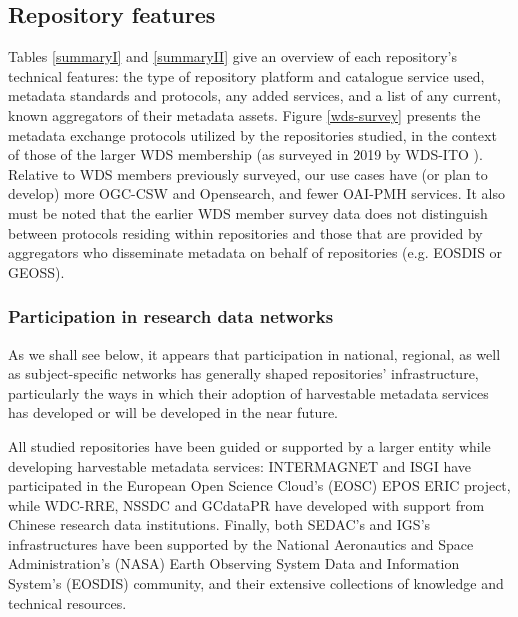 \documentclass{interact}
\begin{document}
\subsection{Repository features}\label{features}
Tables \ref{summaryI} and \ref{summaryII} give an overview of each repository's technical features: the type of repository platform and catalogue service used, metadata standards and protocols, any added services, and a list of any current, known aggregators of their metadata assets. Figure \ref{wds-survey} presents the metadata exchange protocols utilized by the repositories studied, in the context of those of the larger WDS membership (as surveyed in 2019 by WDS-ITO \parencite{payne_world_2020}). Relative to WDS members previously surveyed, our use cases have (or plan to develop) more OGC-CSW and Opensearch, and fewer OAI-PMH services. It also must be noted that the earlier WDS member survey data does not distinguish between protocols residing within repositories and those that are provided by aggregators who disseminate metadata on behalf of repositories (e.g. EOSDIS or GEOSS).

\subsubsection{Participation in research data networks}
As we shall see below, it appears that participation in national, regional, as well as subject-specific networks has generally shaped repositories' infrastructure, particularly the ways in which their adoption of harvestable metadata services has developed or will be developed in the near future.

All studied repositories have been guided or supported by a larger entity while developing harvestable metadata services: INTERMAGNET and ISGI have participated in the European Open Science Cloud's (EOSC) EPOS ERIC project, while WDC-RRE, NSSDC and GCdataPR have developed with support from Chinese research data institutions. Finally, both SEDAC's and IGS's infrastructures have been supported by the National Aeronautics and Space Administration’s (NASA) Earth Observing System Data and Information System's (EOSDIS) community, and their extensive collections of knowledge and technical resources.
\end{document}
